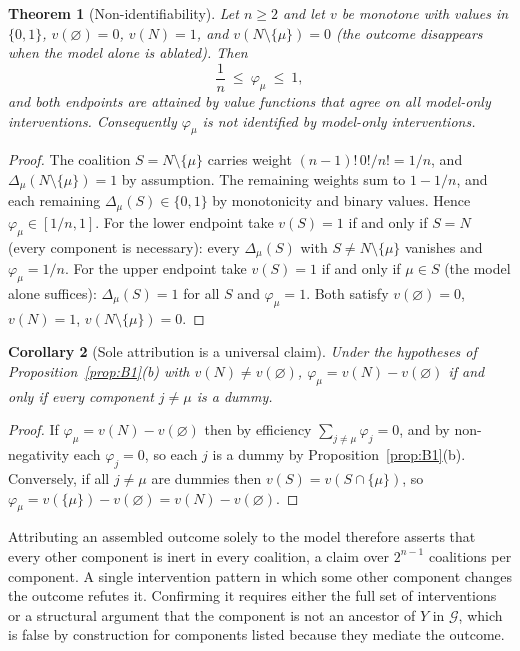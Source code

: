 \documentclass[11pt]{article}
\newtheorem{theorem}{Theorem}[section]
\newtheorem{corollary}[theorem]{Corollary}
\theoremstyle{definition}
\begin{document}
\begin{theorem}[Non-identifiability]\label{thm:B1}
Let $n\ge2$ and let $v$ be monotone with values in $\{0,1\}$, $v(\varnothing)=0$, $v(N)=1$, and $v(N\setminus\{\mu\})=0$ (the outcome disappears when the model alone is ablated). Then
\[
\frac1n\ \le\ \varphi_\mu\ \le\ 1,
\]
and both endpoints are attained by value functions that agree on all model-only interventions. Consequently $\varphi_\mu$ is not identified by model-only interventions.
\end{theorem}
\begin{proof}
The coalition $S=N\setminus\{\mu\}$ carries weight $(n-1)!\,0!/n!=1/n$, and $\Delta_\mu(N\setminus\{\mu\})=1$ by assumption. The remaining weights sum to $1-1/n$, and each remaining $\Delta_\mu(S)\in\{0,1\}$ by monotonicity and binary values. Hence $\varphi_\mu\in[1/n,1]$. For the lower endpoint take $v(S)=1$ if and only if $S=N$ (every component is necessary): every $\Delta_\mu(S)$ with $S\ne N\setminus\{\mu\}$ vanishes and $\varphi_\mu=1/n$. For the upper endpoint take $v(S)=1$ if and only if $\mu\in S$ (the model alone suffices): $\Delta_\mu(S)=1$ for all $S$ and $\varphi_\mu=1$. Both satisfy $v(\varnothing)=0$, $v(N)=1$, $v(N\setminus\{\mu\})=0$.
\end{proof}

\begin{corollary}[Sole attribution is a universal claim]\label{cor:B2}
Under the hypotheses of Proposition~\ref{prop:B1}(b) with $v(N)\ne v(\varnothing)$, $\varphi_\mu=v(N)-v(\varnothing)$ if and only if every component $j\ne\mu$ is a dummy.
\end{corollary}
\begin{proof}
If $\varphi_\mu=v(N)-v(\varnothing)$ then by efficiency $\sum_{j\ne\mu}\varphi_j=0$, and by non-negativity each $\varphi_j=0$, so each $j$ is a dummy by Proposition~\ref{prop:B1}(b). Conversely, if all $j\ne\mu$ are dummies then $v(S)=v(S\cap\{\mu\})$, so $\varphi_\mu=v(\{\mu\})-v(\varnothing)=v(N)-v(\varnothing)$.
\end{proof}

Attributing an assembled outcome solely to the model therefore asserts that every other component is inert in every coalition, a claim over $2^{n-1}$ coalitions per component. A single intervention pattern in which some other component changes the outcome refutes it. Confirming it requires either the full set of interventions or a structural argument that the component is not an ancestor of $Y$ in $\mathcal{G}$, which is false by construction for components listed because they mediate the outcome.
\end{document}
